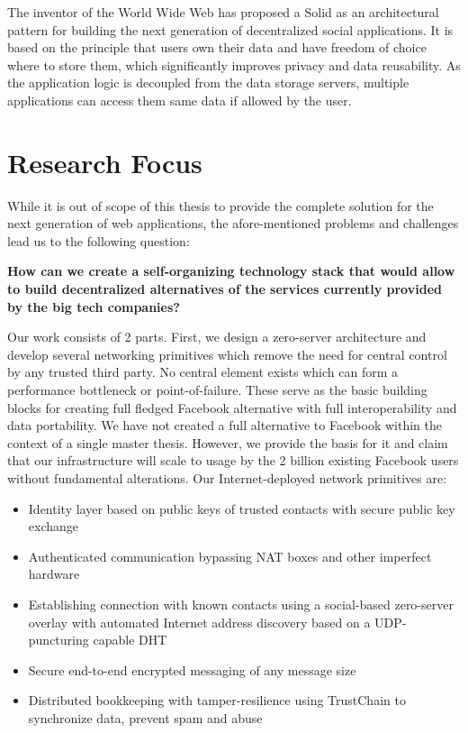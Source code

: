 The inventor of the World Wide Web has proposed a Solid \cite{solid} as an architectural pattern for building the next generation of decentralized social applications. It is based on the principle that users own their data and have freedom of choice where to store them, which significantly improves privacy and data reusability. As the application logic is decoupled from the data storage servers, multiple applications can access them same data if allowed by the user.

\fi

\section{Research Focus}

While it is out of scope of this thesis to provide the complete solution for the next generation of web applications, the afore-mentioned problems and challenges lead us to the following question:

\begin{displayquote}
\textbf{How can we create a self-organizing technology stack that would allow to build decentralized alternatives of the services currently provided by the big tech companies?}
\end{displayquote}

Our work consists of 2 parts. First, we design a zero-server architecture and develop several networking primitives which remove the need for central control by any trusted third party. No central element exists which can form a performance bottleneck or point-of-failure. These serve as the basic building blocks for creating full fledged Facebook alternative with full interoperability and data portability. We have not created a full alternative to Facebook within the context of a single master thesis. However, we provide the basis for it and claim that our infrastructure will scale to usage by the 2 billion existing Facebook users without fundamental alterations. Our Internet-deployed network primitives are:

\begin{itemize}
    \item Identity layer based on public keys of trusted contacts with secure public key exchange
    \item Authenticated communication bypassing NAT boxes and other imperfect hardware
    \item Establishing connection with known contacts using a social-based zero-server overlay with automated Internet address discovery based on a UDP-puncturing capable DHT
    \item Secure end-to-end encrypted messaging of any message size
    \item Distributed bookkeeping with tamper-resilience using TrustChain to synchronize data, prevent spam and abuse
\end{itemize}

